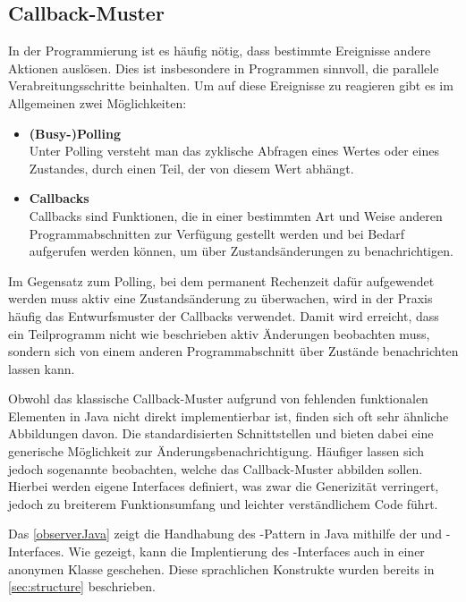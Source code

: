 \subsection{Callback-Muster}
In der Programmierung ist es häufig nötig, dass bestimmte Ereignisse andere Aktionen auslösen. Dies ist insbesondere in Programmen sinnvoll, die parallele Verabreitungsschritte beinhalten. Um auf diese Ereignisse zu reagieren gibt es im Allgemeinen zwei Möglichkeiten: 

\begin{itemize}
    \item \textbf{(Busy-)Polling}\\
    Unter Polling versteht man das zyklische Abfragen eines Wertes oder eines Zustandes, durch einen Teil, der von diesem Wert abhängt.
    \item \textbf{Callbacks}\\
    Callbacks sind Funktionen, die in einer bestimmten Art und Weise anderen Programmabschnitten zur Verfügung gestellt werden und bei Bedarf aufgerufen werden können, um \zB über Zustandsänderungen zu benachrichtigen.
\end{itemize}

Im Gegensatz zum Polling, bei dem permanent Rechenzeit dafür aufgewendet werden muss aktiv eine Zustandsänderung zu überwachen, wird in der Praxis häufig das Entwurfsmuster der Callbacks verwendet. Damit wird erreicht, dass ein Teilprogramm nicht wie beschrieben aktiv Änderungen beobachten muss, sondern sich von einem anderen Programmabschnitt über Zustände benachrichten lassen kann. 

Obwohl das klassische Callback-Muster aufgrund von fehlenden funktionalen Elementen in Java nicht direkt implementierbar ist, finden sich oft sehr ähnliche Abbildungen davon. Die standardisierten Schnittstellen   und  bieten dabei eine generische Möglichkeit zur Änderungsbenachrichtigung. Häufiger lassen sich jedoch sogenannte  beobachten, welche das Callback-Muster abbilden sollen. Hierbei werden eigene Interfaces definiert, was zwar die Generizität verringert, jedoch zu breiterem Funktionsumfang und leichter verständlichem Code führt.

Das \autoref{observerJava} zeigt die Handhabung des -Pattern \cite{gamma_design_1995} in Java mithilfe der  und -Interfaces. Wie gezeigt, kann die Implentierung des -Interfaces auch in einer anonymen Klasse geschehen. Diese sprachlichen Konstrukte wurden bereits in \autoref{sec:structure} beschrieben. 

